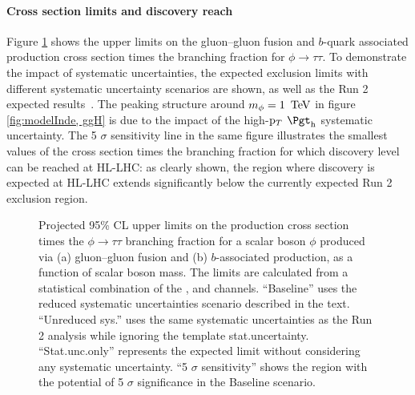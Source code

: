 \paragraph{Cross section limits and discovery reach}
Figure \ref{fig:modelInde} shows the upper limits on the gluon--gluon fusion and $b$-quark associated production cross section times the branching fraction for $\phi\rightarrow\tau\tau$. To demonstrate the impact of systematic uncertainties, the expected exclusion limits with different systematic uncertainty scenarios are shown, as well as the Run 2 expected results~\cite{ATLASRun2Ditau}. The peaking structure around $m_\phi = 1~\,\text{Te\hspace{-.08em}V}$ in figure \ref{fig:modelInde, ggH} is due to the impact of the high-$\mathrm{p}_{T}$ $\tauhad$ systematic uncertainty. The 5 $\sigma$ sensitivity line in the same figure illustrates the smallest values of the cross section times the branching fraction for which discovery level can be reached at HL-LHC: as clearly shown, the region where discovery is expected at HL-LHC extends significantly below the currently expected Run 2 exclusion region.

\begin{figure}[!ht]
    \centering
        \qquad
        \caption{
         Projected 95\% CL upper limits on the production cross section times the $\phi\rightarrow\tau\tau$ branching fraction for a scalar boson $\phi$ produced via (a) gluon--gluon fusion and (b) $b$-associated production, as a function of scalar boson mass. The limits are calculated from a statistical combination of the \ehad, \muhad and \hadhad channels. ``Baseline'' uses the reduced systematic uncertainties scenario described in the text. ``Unreduced sys.\@'' uses the same systematic uncertainties as the Run 2 analysis while ignoring the template stat.\@ uncertainty. ``Stat.\@ unc.\@ only'' represents the expected limit without considering any systematic uncertainty. ``5 $\sigma$ sensitivity'' shows the region with the potential of 5 $\sigma$ significance in the Baseline scenario.
        }
    \label{fig:modelInde}
\end{figure}

